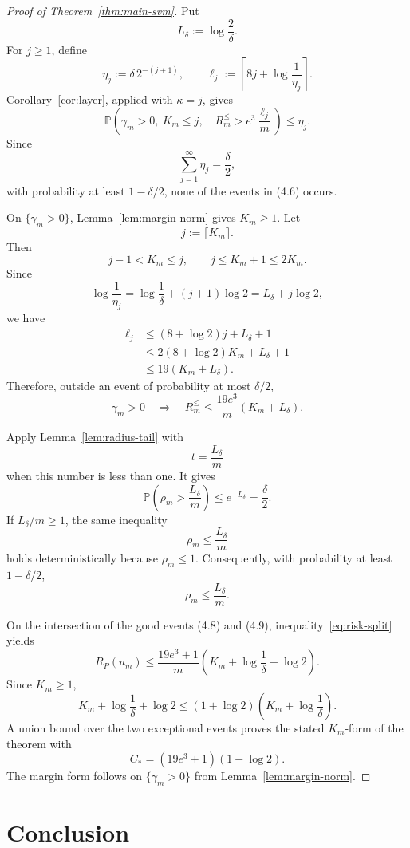 \documentclass[11pt]{article}
\theoremstyle{definition}
\theoremstyle{remark}
\newcommand{\Pp}{\mathbb P}
\newcommand{\Risk}{R_P}
\begin{document}
\begin{proof}[Proof of Theorem~\ref{thm:main-svm}]
Put
\[
 L_\delta:=\log\frac2\delta.
\]
For \(j\ge1\), define
\[
 \eta_j:=\delta\,2^{-(j+1)},
 \qquad
 \ell_j:=
 \left\lceil8j+\log\frac1{\eta_j}\right\rceil.
\]
Corollary~\ref{cor:layer}, applied with \(\kappa=j\), gives
\[
 \Pp\left(
   \gamma_m>0,\ K_m\le j,\quad
   R_m^{\le}>e^3\frac{\ell_j}{m}
 \right)
 \le
 \eta_j.
 \tag{4.6}
\]
Since
\[
 \sum_{j=1}^{\infty}\eta_j=\frac\delta2,
\]
with probability at least \(1-\delta/2\), none of the events in (4.6)
occurs.

On \(\{\gamma_m>0\}\), Lemma~\ref{lem:margin-norm} gives \(K_m\ge1\). Let
\[
 j:=\lceil K_m\rceil.
\]
Then
\[
 j-1<K_m\le j,
 \qquad
 j\le K_m+1\le2K_m.
\]
Since
\[
 \log\frac1{\eta_j}
 =
 \log\frac1\delta+(j+1)\log2
 =
 L_\delta+j\log2,
\]
we have
\[
 \begin{aligned}
 \ell_j
 &\le
 (8+\log2)j+L_\delta+1\\
 &\le
 2(8+\log2)K_m+L_\delta+1\\
 &\le
 19(K_m+L_\delta).
 \end{aligned}
 \tag{4.7}
\]
Therefore, outside an event of probability at most \(\delta/2\),
\[
 \gamma_m>0
 \quad\Longrightarrow\quad
 R_m^{\le}
 \le
 \frac{19e^3}{m}(K_m+L_\delta).
 \tag{4.8}
\]

Apply Lemma~\ref{lem:radius-tail} with
\[
 t=\frac{L_\delta}{m}
\]
when this number is less than one. It gives
\[
 \Pp\left(
   \rho_m>\frac{L_\delta}{m}
 \right)
 \le
 e^{-L_\delta}
 =
 \frac\delta2.
\]
If \(L_\delta/m\ge1\), the same inequality
\[
 \rho_m\le\frac{L_\delta}{m}
\]
holds deterministically because \(\rho_m\le1\). Consequently, with
probability at least \(1-\delta/2\),
\[
 \rho_m\le\frac{L_\delta}{m}.
 \tag{4.9}
\]

On the intersection of the good events (4.8) and (4.9),
inequality~\eqref{eq:risk-split} yields
\[
 \Risk(u_m)
 \le
 \frac{19e^3+1}{m}
 \left(
   K_m+\log\frac1\delta+\log2
 \right).
\]
Since \(K_m\ge1\),
\[
 K_m+\log\frac1\delta+\log2
 \le
 (1+\log2)
 \left(
   K_m+\log\frac1\delta
 \right).
\]
A union bound over the two exceptional events proves the stated \(K_m\)-form
of the theorem with
\[
 C_*=(19e^3+1)(1+\log2).
\]
The margin form follows on \(\{\gamma_m>0\}\) from
Lemma~\ref{lem:margin-norm}.
\end{proof}


\section{Conclusion}
\end{document}
